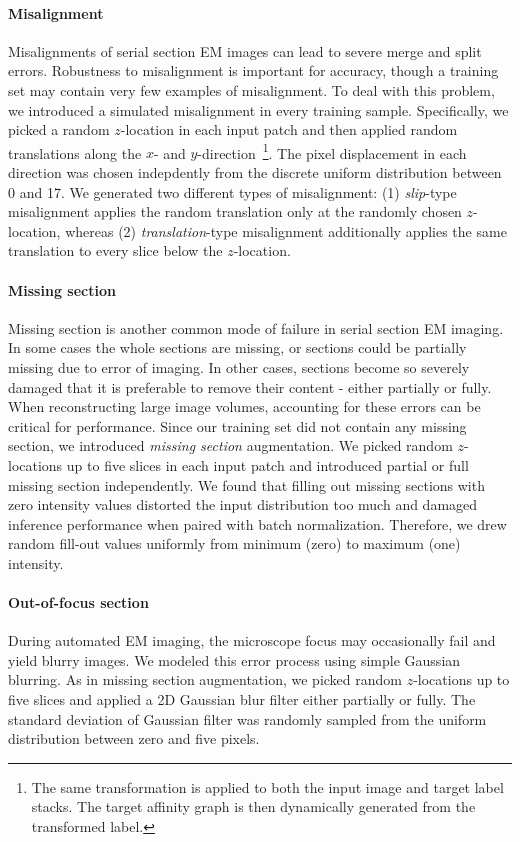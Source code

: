 \documentclass{article}
\begin{document}
\paragraph{Misalignment} Misalignments of serial section EM images can lead to
severe merge and split errors. Robustness to misalignment is important for
accuracy, though a training set may contain very few examples of misalignment.
To deal with this problem, we introduced a simulated misalignment in every
training sample. Specifically, we picked a random $z$-location in each input
patch and then applied random translations along the $x$- and
$y$-direction~\footnote{The same transformation is applied to both the input
image and target label stacks. The target affinity graph is then dynamically
generated from the transformed label.}. The pixel displacement in each direction
was chosen indepdently from the discrete uniform distribution between 0 and 17.
We generated two different types of misalignment: (1) \textit{slip}-type
misalignment applies the random translation only at the randomly chosen
$z$-location, whereas (2) \textit{translation}-type misalignment additionally
applies the same translation to every slice below the $z$-location.

\paragraph{Missing section} Missing section is another common mode of failure in
serial section EM imaging. In some cases the whole sections are missing, or
sections could be partially missing due to error of imaging. In other cases,
sections become so severely damaged that it is preferable to remove their
content - either partially or fully. When reconstructing large image volumes,
accounting for these errors can be critical for performance. Since our training
set did not contain any missing section, we introduced \textit{missing section}
augmentation. We picked random $z$-locations up to five slices in each input
patch and introduced partial or full missing section independently. We found
that filling out missing sections with zero intensity values distorted the input
distribution too much and damaged inference performance when paired with batch
normalization. Therefore, we drew random fill-out values uniformly from minimum
(zero) to maximum (one) intensity.

\paragraph{Out-of-focus section}  During automated EM imaging, the microscope
focus may occasionally fail and yield blurry images. We modeled this error
process using simple Gaussian blurring. As in missing section augmentation, we
picked random $z$-locations up to five slices and applied a 2D Gaussian blur
filter either partially or fully. The standard deviation of Gaussian filter was
randomly sampled from the uniform distribution between zero and five pixels.
\end{document}
